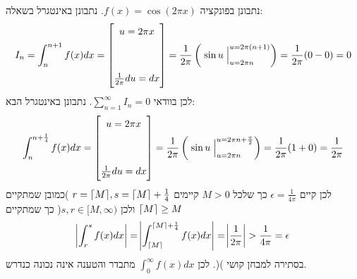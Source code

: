 \documentclass[11pt, oneside]{article}
\newcommand{\qed}{\R{$\blacksquare$}}
\newcommand{\br}{\\\\\\\\}
\newcommand{\m}[3]{\R{משפט #3#2.#1}}
\newcommand{\defi}[3]{\int_{#1}^{#2} #3}
\newcommand{\evi}[3]{\eval[2]{\;#1\;}_{#3}^{#2}}
\newcommand{\sub}[2]{\begin{bmatrix} #1\br #2\end{bmatrix}}
\DeclarePairedDelimiter\ceil{\lceil}{\rceil}
\begin{document}
נתבונן בפונקציה $f(x) = \cos(2\pi x)$. נתבונן באינטגרל בשאלה:
\[
I_{n} = \defi{n}{n + 1}{f(x)dx}
= \sub{u = 2\pi x}{\frac{1}{2\pi}du = dx}
= \frac{1}{2\pi}\left(\evi{\sin{u}}{u = 2\pi(n + 1)}{u = 2\pi n}\right)
= \frac{1}{2\pi}(0 - 0) = 0
\]
לכן בוודאי $\sum^{\infty}_{n = 1} I_{n} = 0$. נתבונן באינטגרל הבא:
\[
\defi{n}{n + \frac{1}{4}}{f(x)dx}
= \sub{u = 2\pi x}{\frac{1}{2\pi}du = dx}
= \frac{1}{2\pi}\left(\evi{\sin{u}}{u = 2\pi n + \frac{\pi}{2}}{u = 2\pi n}\right)
= \frac{1}{2\pi}(1 + 0) = \frac{1}{2\pi}
\]
לכן קיים $\epsilon = \frac{1}{4\pi}$ כך שלכל $M > 0$ קיימים $r = \ceil{M}, s = \ceil{M} +  \frac{1}{4}$ )כמובן שמתקיים $\ceil{M} \ge M$ ולכן $s, r \in [M, \infty)$( כך שמתקיים
\[
\abs{\defi{r}{s}{f(x)dx}}
= \abs{\defi{\ceil{M}}{\ceil{M} + \frac{1}{4}}{f(x)dx}}
= \abs{\frac{1}{2\pi}} > \frac{1}{4\pi} = \epsilon
\]
בסתירה למבחן קושי )\m{3}{51}{}(. לכן $\defi{0}{\infty}{f(x)dx}$ מתבדר והטענה אינה נכונה כנדרש.
\br\qed
\end{document}
